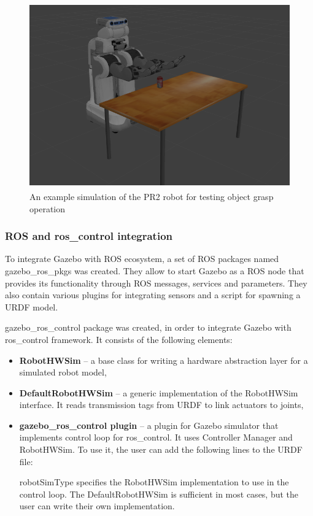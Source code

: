 \documentclass[english,inz,shortabstract]{iithesis}
\begin{document}
	\begin{figure}[ht]
		\centering 
		\captionsetup{margin=2.5cm} 
		\includegraphics[height=8cm]{img/gazebo_pr2.png}
		\caption{An example simulation of the PR2 robot for testing object grasp operation}
		\label{fig:gazebo_pr2}
	\end{figure}

	\subsubsection{ROS and ros\_control integration}
	To integrate Gazebo with ROS ecosystem, a set of ROS packages named \textsf{gazebo\_ros\_pkgs} was created. They allow to start Gazebo as a ROS node that provides its functionality through ROS messages, services and parameters. They also contain various plugins for integrating sensors and a script for spawning a URDF model.

	\textsf{gazebo\_ros\_control} package was created, in order to integrate Gazebo with \textsf{ros\_control} framework. It consists of the following elements:
	\begin{itemize}
		\item \textbf{RobotHWSim} -- a base class for writing a hardware abstraction layer for a simulated robot model,
		\item \textbf{DefaultRobotHWSim} -- a generic implementation of the RobotHWSim interface. It reads transmission tags from URDF to link actuators to joints,
		\item \textbf{gazebo\_ros\_control plugin} -- a plugin for Gazebo simulator that implements control loop for ros\_control. It uses Controller Manager and RobotHWSim. To use it, the user can add the following lines to the URDF file:
		
		\textsf{robotSimType} specifies the RobotHWSim implementation to use in the control loop. The \mbox{DefaultRobotHWSim} is sufficient in most cases, but the user can write their own implementation.
	\end{itemize}
\end{document}
